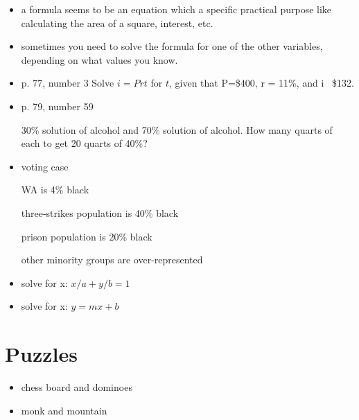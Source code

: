 \documentclass[fleqn]{article}
\begin{document}
\begin{itemize}
\item a formula seems to be an equation which a specific practical purpose like calculating the area of a square,
  interest, etc.

\item sometimes you need to solve the formula for one of the other variables, depending on what values you know.

\item p. 77, number 3
Solve \(i = Prt\) for $t$, given that P=\$400, r = 11\%, and i \ \$132.

\vspace{1 in}

\item p. 79, number 59

30\% solution of alcohol and 70\% solution of alcohol.  How many quarts of each to get 20 quarts of 40\%?

\item
voting case

WA is 4\% black

three-strikes population is 40\% black

prison population is 20\% black

other minority groups are over-represented

\vspace{3 in}

\item
solve for x:
\(x/a + y/b = 1 \)

\vspace{1 in}

\item
solve for x:
\(y = mx + b \)


\end{itemize}

\section{Puzzles}

\begin{itemize}

\item
chess board and dominoes

\item 
monk and mountain

\end{itemize}
\end{document}
